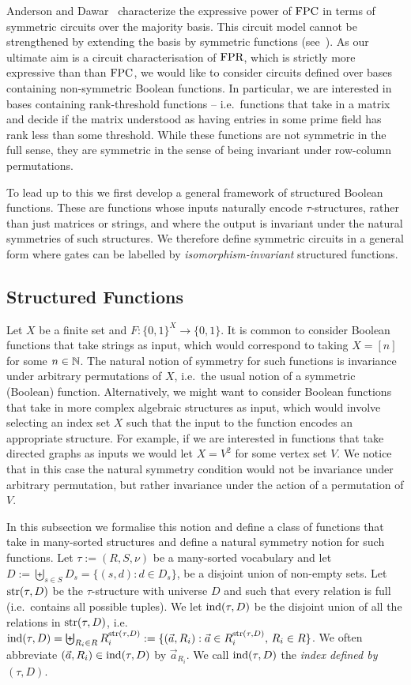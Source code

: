 \documentclass[a4paper,UKenglish]{lipics-v2018}
\begin{document}
Anderson and Dawar~\cite{AndersonD17} characterize the expressive power of
$\text{\upshape FPC}$ in terms of symmetric circuits over the majority basis. This circuit
model cannot be strengthened by extending the basis by symmetric functions
(see~\cite{DW-arxiv}). As our ultimate aim is a circuit characterisation of
$\text{\upshape FPR}$, which is strictly more expressive than than $\text{\upshape FPC}$, we would like to
consider circuits defined over bases containing non-symmetric Boolean functions.
In particular, we are interested in bases containing rank-threshold functions --
i.e.\ functions that take in a matrix and decide if the matrix understood as
having entries in some prime field has rank less than some threshold. While
these functions are not symmetric in the full sense, they are symmetric in the
sense of being invariant under row-column permutations.

To lead up to this we first develop a general framework of structured Boolean
functions. These are functions whose inputs naturally encode $\tau$-structures,
rather than just matrices or strings, and where the output is invariant under
the natural symmetries of such structures. We therefore define symmetric
circuits in a general form where gates can be labelled by
\emph{isomorphism-invariant} structured functions.

\subsection{Structured Functions}
Let $X$ be a finite set and $F: \{0,1\}^X \rightarrow \{0,1\}$. It is common to
consider Boolean functions that take strings as input, which would correspond to
taking $X = [n]$ for some $n \in \mathbb{N}$. The natural notion of symmetry for such
functions is invariance under arbitrary permutations of $X$, i.e.\ the usual
notion of a symmetric (Boolean) function. Alternatively, we might want to
consider Boolean functions that take in more complex algebraic structures as
input, which would involve selecting an index set $X$ such that the input to the
function encodes an appropriate structure. For example, if we are interested in
functions that take directed graphs as inputs we would let $X = V^2$ for some
vertex set $V$. We notice that in this case the natural symmetry condition would
not be invariance under arbitrary permutation, but rather invariance under the
action of a permutation of $V$.

In this subsection we formalise this notion and define a class of functions that
take in many-sorted structures and define a natural symmetry notion for such
functions. Let $\tau := (R, S, \nu)$ be a many-sorted vocabulary and let $D :=
\biguplus_{s \in S} D_{s} = \{(s,d) : d \in D_s\}$, be a disjoint union of
non-empty sets. Let $\text{str}(\tau, D)$ be the $\tau$-structure with universe $D$
and such that every relation is full (i.e.\ contains all possible tuples). We
let $\text{\upshape ind} (\tau, D)$ be the disjoint union of all the relations in $\text{str}(\tau,
  D)$, i.e.\ $\text{\upshape ind}(\tau, D) = \biguplus_{R_i \in R} R^{\text{str}(\tau,D)}_i := \{
(\vec{a}, R_i) : \vec{a} \in R^{\text{str}(\tau,D)}_i, \, R_i \in R \} $. We often
abbreviate $(\vec{a}, R_i) \in \text{\upshape ind}(\tau, D)$ by $\vec{a}_{R_i}$. We call
$\text{\upshape ind}(\tau, D)$ the \emph{index defined by $(\tau, D)$}.
\end{document}
